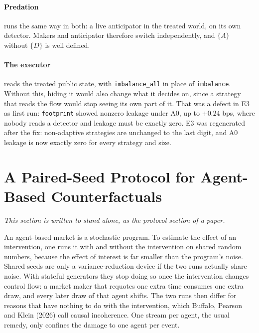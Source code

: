 \documentclass[11pt,a4paper]{article}
\newcommand{\code}[1]{\texttt{#1}}
\begin{document}
\paragraph{Predation} runs the same way in both: a live anticipator in the treated world, on its own detector. Makers and
anticipator therefore switch independently, and $\{A\}$ without $\{D\}$ is well defined.

\paragraph{The executor} reads the treated public state, with \code{imbalance\_all} in place of \code{imbalance}. Without this,
hiding it would also change what it decides on, since a strategy that reads the flow would stop seeing its own part of it. That was a defect in E3 as first run: \code{footprint} showed nonzero leakage under A0, up to $+0.24$ bps, where nobody reads a detector and leakage must be exactly zero. E3 was regenerated after the fix: non-adaptive strategies are unchanged to the last digit, and A0 leakage is now exactly zero for every strategy and size.

\section{A Paired-Seed Protocol for Agent-Based Counterfactuals}
\label{sec:protocol}

\emph{This section is written to stand alone, as the protocol section of a paper.}

An agent-based market is a stochastic program. To estimate the effect of an intervention, one runs it with and without the
intervention on shared random numbers, because the effect of interest is far smaller than the program's noise. Shared seeds are
only a variance-reduction device if the two runs actually share noise. With stateful generators they stop doing so once the
intervention changes control flow: a market maker that requotes one extra time consumes one extra draw, and every later draw of that
agent shifts. The two runs then differ for reasons that have nothing to do with the intervention, which Buffalo, Pearson and Klein
(2026) call causal incoherence. One stream per agent, the usual remedy, only confines the damage to one agent per event.
\end{document}
